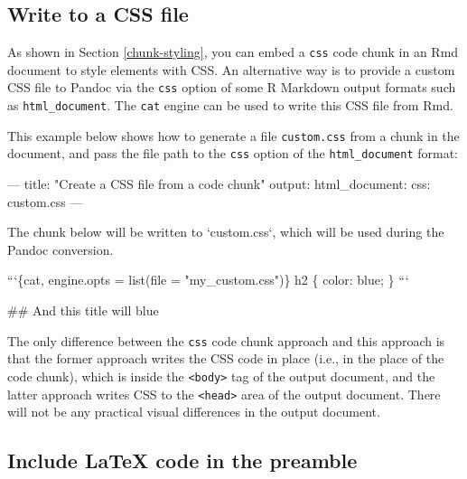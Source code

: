 \documentclass[
  11pt,
]{krantz}
\newenvironment{Shaded}{\begin{snugshade}}{\end{snugshade}}
\newcommand{\BaseNTok}[1]{\textcolor[rgb]{0.06,0.06,0.06}{#1}}
\newcommand{\FunctionTok}[1]{\textcolor[rgb]{0,0,0}{#1}}
\newcommand{\NormalTok}[1]{#1}
\begin{document}
\hypertarget{write-to-a-css-file}{%
\subsection{Write to a CSS file}\label{write-to-a-css-file}}

As shown in Section \ref{chunk-styling}, you can embed a \texttt{css} code chunk in an Rmd document to style elements with CSS. An alternative way is to provide a custom CSS file to Pandoc via the \texttt{css} option of some R Markdown output formats such as \texttt{html\_document}. The \texttt{cat} engine can be used to write this CSS file from Rmd.

This example below shows how to generate a file \texttt{custom.css} from a chunk in the document, and pass the file path to the \texttt{css} option of the \texttt{html\_document} format:

\begin{Shaded}
\begin{Highlighting}[]
\NormalTok{---}
\NormalTok{title: "Create a CSS file from a code chunk"}
\NormalTok{output: }
\NormalTok{  html_document:}
\BaseNTok{    css: custom.css}
\NormalTok{---}

\NormalTok{The chunk below will be written to }\BaseNTok{`custom.css`}\NormalTok{, which}
\NormalTok{will be used during the Pandoc conversion.}

\BaseNTok{```\{cat, engine.opts = list(file = "my_custom.css")\}}
\BaseNTok{h2 \{}
\BaseNTok{  color: blue;}
\BaseNTok{\}}
\BaseNTok{```}

\FunctionTok{## And this title will blue}
\end{Highlighting}
\end{Shaded}

The only difference between the \texttt{css} code chunk approach and this approach is that the former approach writes the CSS code in place (i.e., in the place of the code chunk), which is inside the \texttt{\textless{}body\textgreater{}} tag of the output document, and the latter approach writes CSS to the \texttt{\textless{}head\textgreater{}} area of the output document. There will not be any practical visual differences in the output document.

\hypertarget{include-latex-code-in-the-preamble}{%
\subsection{Include LaTeX code in the preamble}\label{include-latex-code-in-the-preamble}}
\end{document}

